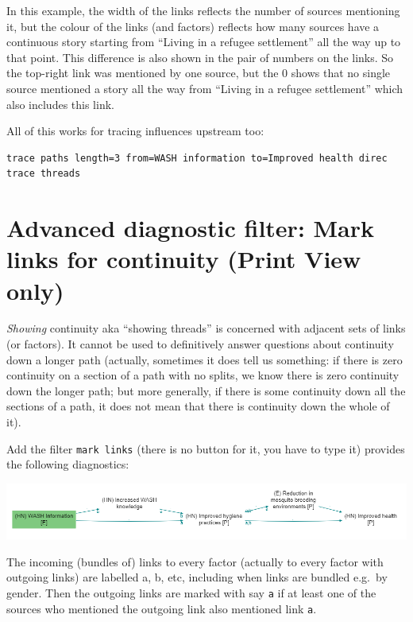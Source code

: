 \documentclass[
]{book}
\begin{document}
In this example, the width of the links reflects the number of sources mentioning it, but the colour of the links (and factors) reflects how many sources have a continuous story starting from ``Living in a refugee settlement'' all the way up to that point. This difference is also shown in the pair of numbers on the links. So the top-right link was mentioned by one source, but the 0 shows that no single source mentioned a story all the way from ``Living in a refugee settlement'' which also includes this link.

All of this works for tracing influences upstream too:

\begin{verbatim}
trace paths length=3 from=WASH information to=Improved health direc
trace threads
\end{verbatim}

\hypertarget{advanced-diagnostic-filter-mark-links-for-continuity-print-view-only}{%
\section{Advanced diagnostic filter: Mark links for continuity (Print View only)}\label{advanced-diagnostic-filter-mark-links-for-continuity-print-view-only}}

\emph{Showing} continuity aka ``showing threads'' is concerned with adjacent sets of links (or factors). It cannot be used to definitively answer questions about continuity down a longer path (actually, sometimes it does tell us something: if there is zero continuity on a section of a path with no splits, we know there is zero continuity down the longer path; but more generally, if there is some continuity down all the sections of a path, it does not mean that there is continuity down the whole of it).

Add the filter \texttt{mark\ links} (there is no button for it, you have to type it) provides the following diagnostics:

\includegraphics{_assets/image-20211215081328481.png}

The incoming (bundles of) links to every factor (actually to every factor with outgoing links) are labelled a, b, etc, including when links are bundled e.g.~by gender. Then the outgoing links are marked with say \texttt{a} if at least one of the sources who mentioned the outgoing link also mentioned link \texttt{a}.
\end{document}
